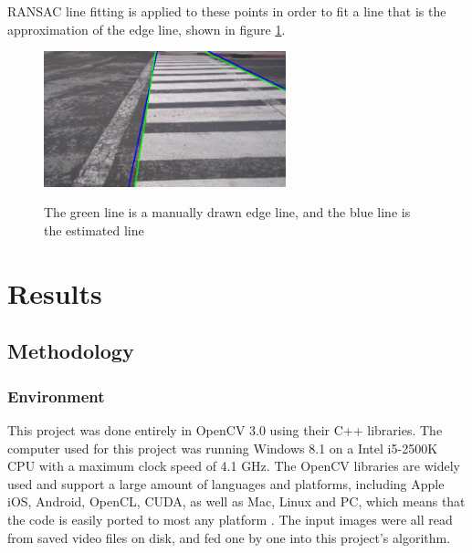 \documentclass[12pt]{ucthesis}
\newcommand{\captionfonts}{\small\bf\ssp}
\begin{document}
RANSAC line fitting is applied to these points in order to fit a line that is the approximation of the edge line, shown in figure \ref{fig:LinesUsingJustGoodStartAndEnds}. 

\begin{figure}[h!]
\begin{center}
\includegraphics[width=7cm]{LinesUsingJustGoodStartAndEnds.png}
\captionfonts
\caption[Manually Entered and Estimated Line]{The green line is a manually drawn edge line, and the blue line is the estimated line}
\label{fig:LinesUsingJustGoodStartAndEnds}
\end{center}
\end{figure}


\chapter{Results}
\label{results}


\section{Methodology}

\subsection{Environment}
This project was done entirely in OpenCV 3.0 using their C++ libraries. The computer used for this project was running Windows 8.1 on a Intel i5-2500K CPU with a maximum clock speed of 4.1 GHz. The OpenCV libraries are widely used and support a large amount of languages and platforms, including Apple iOS, Android, OpenCL, CUDA, as well as Mac, Linux and PC, which means that the code is easily ported to most any platform \cite{OpenCVPlatforms}. The input images were all read from saved video files on disk, and fed one by one into this project's algorithm. 
\end{document}
